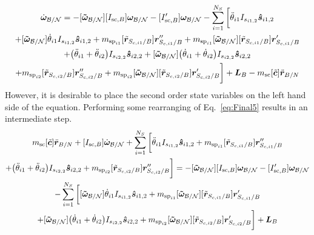 \documentclass[paper]{aiaaNew}
\begin{document}
	\begin{multline}
	[I_{\text{sc},B}] \dot{\bm\omega}_{\cal B/N} = -[\bm{\tilde{\omega}}_{\cal B/N}] [I_{\text{sc},B}] \bm\omega_{\cal B/N} - [I'_{\text{sc},B}] \bm\omega_{\cal B/N} -  \sum\limits_{i=1}^{N_S} \bigg[ \ddot{\theta}_{i1} I_{s_{i1,2}}\bm{\hat{s}}_{i1,2}\\
	+ [\bm{\tilde{\omega}}_{\cal B/N}] \dot{\theta}_{i1} I_{s_{i1,2}}\bm{\hat{s}}_{i1,2} 
	+m_{\text{sp}_{i1}} [\tilde{\bm{r}}_{S_{c,i1}/B}] \bm{r}''_{S_{c,i1}/B}
	+m_{\text{sp}_{i1}} [\bm{\tilde{\omega}}_{\cal B/N}] [\tilde{\bm{r}}_{S_{c,i1}/B}] \bm{r}'_{S_{c,i1}/B}\\
	+\big(\ddot{\theta}_{i1}+\ddot{\theta}_{i2}\big) I_{s_{i2,2}}\bm{\hat{s}}_{i2,2}
	+ [\bm{\tilde{\omega}}_{\cal B/N}] \big(\dot{\theta}_{i1}+\dot{\theta}_{i2}\big) I_{s_{i2,2}}\bm{\hat{s}}_{i2,2} \\
	+m_{\text{sp}_{i2}} [\tilde{\bm{r}}_{S_{c,i2}/B}] \bm{r}''_{S_{c,i2}/B}
	+m_{\text{sp}_{i2}} [\bm{\tilde{\omega}}_{\cal B/N}] [\tilde{\bm{r}}_{S_{c,i2}/B}] \bm{r}'_{S_{c,i2}/B}\bigg]
	+ \bm{L}_B - m_{\text{sc}} [\tilde{\bm{c}}] \ddot{\bm r}_{B/N}
	\label{eq:Final5}
	\end{multline}
	However, it is desirable to place the second order state variables on the left hand side of the equation. Performing some rearranging of Eq.~\eqref{eq:Final5} results in an intermediate step. 
	\begin{multline}
	m_{\text{sc}} [\tilde{\bm{c}}] \ddot{\bm r}_{B/N} + [I_{\text{sc},B}] \dot{\bm\omega}_{\cal B/N} + \sum\limits_{i=1}^{N_S} \bigg[ \ddot{\theta}_{i1} I_{s_{i1,2}}\bm{\hat{s}}_{i1,2} 
	+m_{\text{sp}_{i1}} [\tilde{\bm{r}}_{S_{c,i1}/B}] \bm{r}''_{S_{c,i1}/B}\\
	+\big(\ddot{\theta}_{i1}+\ddot{\theta}_{i2}\big) I_{s_{i2,2}}\bm{\hat{s}}_{i2,2} 
	+m_{\text{sp}_{i2}} [\tilde{\bm{r}}_{S_{c,i2}/B}] \bm{r}''_{S_{c,i2}/B}\bigg] = -[\bm{\tilde{\omega}}_{\cal B/N}] [I_{\text{sc},B}] \bm\omega_{\cal B/N} - [I'_{\text{sc},B}] \bm\omega_{\cal B/N} \\
	-  \sum\limits_{i=1}^{N_S} \bigg[
	[\bm{\tilde{\omega}}_{\cal B/N}] \dot{\theta}_{i1} I_{s_{i1,2}}\bm{\hat{s}}_{i1,2} 
	+m_{\text{sp}_{i1}} [\bm{\tilde{\omega}}_{\cal B/N}] [\tilde{\bm{r}}_{S_{c,i1}/B}] \bm{r}'_{S_{c,i1}/B}\\
	+ [\bm{\tilde{\omega}}_{\cal B/N}] \big(\dot{\theta}_{i1}+\dot{\theta}_{i2}\big) I_{s_{i2,2}}\bm{\hat{s}}_{i2,2}
	+m_{\text{sp}_{i2}} [\bm{\tilde{\omega}}_{\cal B/N}] [\tilde{\bm{r}}_{S_{c,i2}/B}] \bm{r}'_{S_{c,i2}/B}\bigg]
	+ \bm{L}_B 
	\label{eq:Finalint}
	\end{multline}
\end{document}
